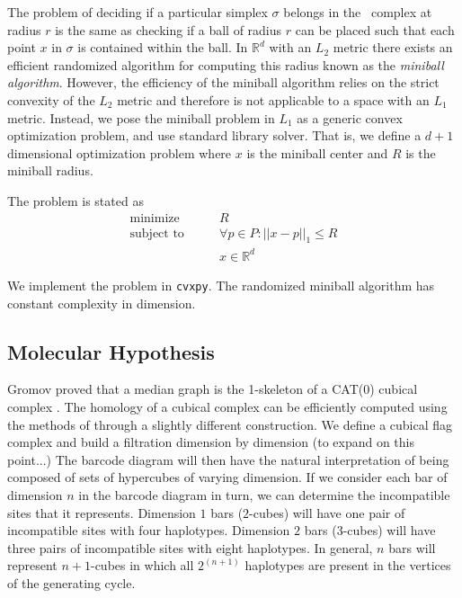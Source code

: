 The problem of deciding if a particular simplex $\sigma$ belongs in the \Cech\ complex at radius $r$ is the same as checking if a ball of radius $r$ can be placed such that each point $x$ in $\sigma$ is contained within the ball.
In $\mathbb{R}^d$ with an $L_2$ metric there exists an efficient randomized algorithm for computing this radius known as the \emph{miniball algorithm}.\autocite{Gartner:1999}
However, the efficiency of the miniball algorithm relies on the strict convexity of the $L_2$ metric and therefore is not applicable to a space with an $L_1$ metric.
Instead, we pose the miniball problem in $L_1$ as a generic convex optimization problem, and use standard library solver.
That is, we define a $d+1$ dimensional optimization problem where $x$ is the miniball center and $R$ is the miniball radius.

The problem is stated as
\begin{align*}
\text{minimize}\qquad   &  R \\
\text{subject to}\qquad & \forall p \in P: ||x-p||_{1} \leq R \\
                        & x \in \mathbb{R}^d
\end{align*}

We implement the problem in \texttt{cvxpy}.
The randomized miniball algorithm has constant complexity in dimension.

\subsection{Molecular Hypothesis}

Gromov proved that a median graph is the 1-skeleton of a CAT(0) cubical complex \citep{Gromov:1987}.
The homology of a cubical complex can be efficiently computed using the methods of \citet{Kaczynski:2004} through a slightly different construction.
We define a cubical flag complex and build a filtration dimension by dimension (to expand on this point...)
The barcode diagram will then have the natural interpretation of being composed of sets of hypercubes of varying dimension.
If we consider each bar of dimension $n$ in the barcode diagram in turn, we can determine the incompatible sites that it represents.
Dimension $1$ bars ($2$-cubes) will have one pair of incompatible sites with four haplotypes.
Dimension $2$ bars ($3$-cubes) will have three pairs of incompatible sites with eight haplotypes.
In general, $n$ bars will represent $n+1$-cubes in which all $2^{(n+1)}$ haplotypes are present in the vertices of the generating cycle.

